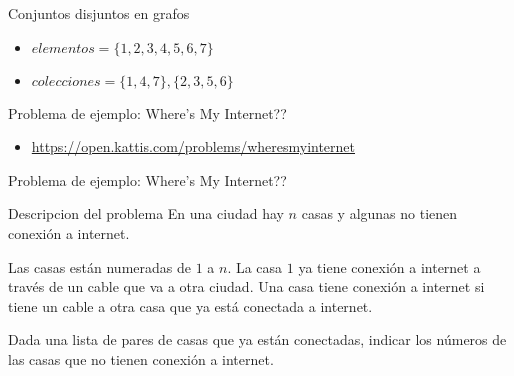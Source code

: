 \documentclass[10pt]{beamer}
\newcommand{\bi}{\begin{itemize}}
\newcommand{\ei}{\end{itemize}}
\begin{document}
\begin{frame}{Conjuntos disjuntos en grafos}
    \begin{figure}
    \end{figure}

    \bi
        \item $elementos = \{1,2,3,4,5,6,7\}$
        \item $colecciones = \{1,4,7\}, \{2,3,5,6\}$
    \ei
\end{frame}

\begin{frame}{Problema de ejemplo: Where's My Internet??}
    \bi
        \item \href{https://open.kattis.com/problems/wheresmyinternet}{https://open.kattis.com/problems/wheresmyinternet}
    \ei
\end{frame}

\begin{frame}{Problema de ejemplo: Where's My Internet??}

  \begin{block}{Descripcion del problema}
    En una ciudad hay $n$ casas y algunas no tienen conexión a internet. 
    
    Las casas están numeradas de $1$ a $n$. 
    La casa $1$ ya tiene conexión a internet a través de un cable que va a otra ciudad. 
    Una casa tiene conexión a internet si tiene un cable a otra casa que ya está conectada a internet.

    Dada una lista de pares de casas que ya están conectadas, indicar los números de las casas que no tienen conexión a internet.
    \end{block}
\end{frame}
\end{document}

